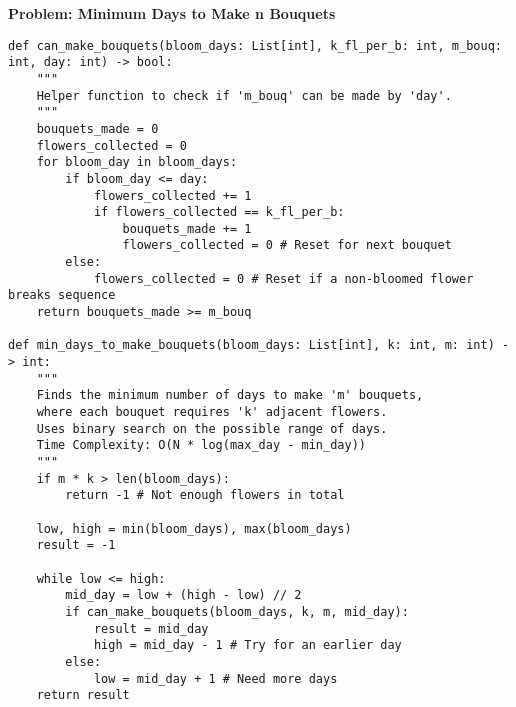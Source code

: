 \noindent\textbf{Problem: Minimum Days to Make n Bouquets}
\begin{verbatim}
def can_make_bouquets(bloom_days: List[int], k_fl_per_b: int, m_bouq: int, day: int) -> bool:
    """
    Helper function to check if 'm_bouq' can be made by 'day'.
    """
    bouquets_made = 0
    flowers_collected = 0
    for bloom_day in bloom_days:
        if bloom_day <= day:
            flowers_collected += 1
            if flowers_collected == k_fl_per_b:
                bouquets_made += 1
                flowers_collected = 0 # Reset for next bouquet
        else:
            flowers_collected = 0 # Reset if a non-bloomed flower breaks sequence
    return bouquets_made >= m_bouq

def min_days_to_make_bouquets(bloom_days: List[int], k: int, m: int) -> int:
    """
    Finds the minimum number of days to make 'm' bouquets,
    where each bouquet requires 'k' adjacent flowers.
    Uses binary search on the possible range of days.
    Time Complexity: O(N * log(max_day - min_day))
    """
    if m * k > len(bloom_days):
        return -1 # Not enough flowers in total

    low, high = min(bloom_days), max(bloom_days)
    result = -1

    while low <= high:
        mid_day = low + (high - low) // 2
        if can_make_bouquets(bloom_days, k, m, mid_day):
            result = mid_day
            high = mid_day - 1 # Try for an earlier day
        else:
            low = mid_day + 1 # Need more days
    return result
\end{verbatim}

